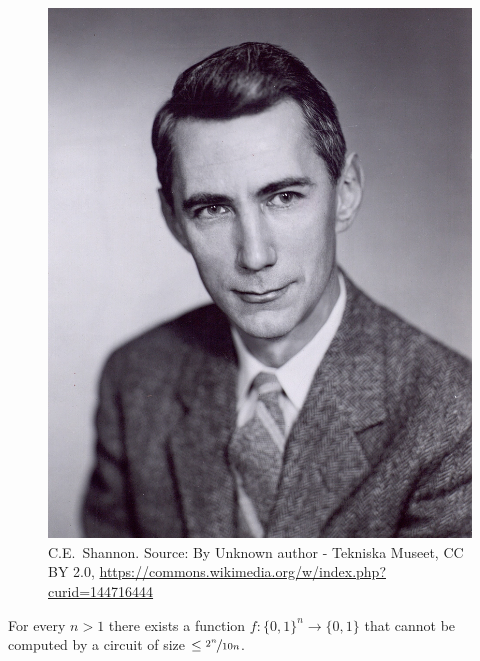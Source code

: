 \begin{figure}
    \centering
    \includegraphics[width=0.25\linewidth]{images/Shannon.jpg}
    \caption{C.E.~Shannon. Source: By Unknown author - Tekniska Museet, CC BY 2.0, \url{https://commons.wikimedia.org/w/index.php?curid=144716444}}
    \label{Claude Shannon}
\end{figure}






\begin{theorem}
    For every $n>1$ there exists a function $f:\{0,1\}^n \rightarrow\{0,1\}$ that cannot be computed by a circuit of size  $\le \nicefrac{2^n}{10 n}$.
\end{theorem}

